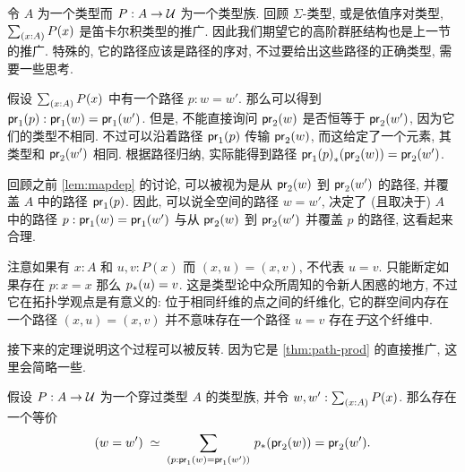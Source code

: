 %
令 $A$ 为一个类型而 $P:A\to\mathcal{U}$ 为一个类型族.
回顾 $\Sigma$-类型, 或是依值序对类型, $\sm{x:A} P(x)$ 是笛卡尔积类型的推广.
因此我们期望它的高阶群胚结构也是上一节的推广.
特殊的, 它的路径应该是路径的序对, 不过要给出这些路径的正确类型, 需要一些思考.

假设 $\sm{x:A}P(x)$ 中有一个路径 $p:w=w'$.
那么可以得到 ${\mathsf{pr}_{1}}\mathopen{}\left({p}\right)\mathclose{}:\mathsf{pr}_{1}(w)=\mathsf{pr}_{1}(w')$.
但是, 不能直接询问 $\mathsf{pr}_{2}(w)$ 是否恒等于 $\mathsf{pr}_{2}(w')$, 因为它们的类型不相同.
不过可以沿着路径 ${\mathsf{pr}_{1}}\mathopen{}\left({p}\right)\mathclose{}$ 传输 $\mathsf{pr}_{2}(w)$, 而这给定了一个元素, 其类型和 $\mathsf{pr}_{2}(w')$ 相同.
根据路径归纳, 实际能得到路径 ${{\mathsf{pr}_{1}}\mathopen{}\left({p}\right)\mathclose{}}_{*}\mathopen{}\left({\mathsf{pr}_{2}(w)}\right)\mathclose{}=\mathsf{pr}_{2}(w')$.

回顾之前 \cref{lem:mapdep} 的讨论,
可以被视为是从 $\mathsf{pr}_{2}(w)$ 到 $\mathsf{pr}_{2}(w')$ 的路径, 并覆盖 $A$ 中的路径 ${\mathsf{pr}_{1}}\mathopen{}\left({p}\right)\mathclose{}$.
%
%
因此, 可以说全空间的路径 $w=w'$, 决定了 (且取决于) $A$ 中的路径 $p:\mathsf{pr}_{1}(w)=\mathsf{pr}_{1}(w')$ 与从 $\mathsf{pr}_{2}(w)$ 到 $\mathsf{pr}_{2}(w')$ 并覆盖 $p$ 的路径, 这看起来合理.

\begin{rmk}
    注意如果有 $x:A$ 和 $u,v:P(x)$ 而 $(x,u)=(x,v)$, 不代表 $u=v$.
    只能断定如果存在 $p:x=x$ 那么 ${p}_{*}\mathopen{}\left({u}\right)\mathclose{} = v$.
    这是类型论中众所周知的令新人困惑的地方, 不过它在拓扑学观点是有意义的:
    位于相同纤维的点之间的纤维化, 它的群空间内存在一个路径 $(x,u)=(x,v)$ 并不意味存在一个路径 $u=v$ 存在\emph{于}这个纤维中.
\end{rmk}

接下来的定理说明这个过程可以被反转.
因为它是 \cref{thm:path-prod} 的直接推广, 这里会简略一些.

\begin{thm}
    \label{thm:path-sigma}
    假设 $P:A\to\mathcal{U}$ 为一个穿过类型 $A$ 的类型族, 并令 $w,w':\sm{x:A}P(x)$. 那么存在一个等价
    \begin{equation*}
        \eqvspaced{(w=w')}{\dsm{p:\proj{1}(w)=\proj{1}(w')} \trans{p}{\proj{2}(w)}=\proj{2}(w')}.
    \end{equation*}
\end{thm}

